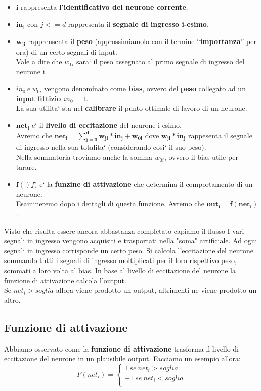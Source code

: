 \begin{itemize}
    \item \( \mathbf{i}\) rappresenta \textbf{l'identificativo del neurone corrente}.
    \item \( \mathbf{in_j} \) con  \(j<=d\) rappresenta il 
%    
    \textbf{segnale di ingresso i-esimo}.
    \item \( \mathbf{w_{ji}} \) rapprensenta il \textbf{peso} 
%
    (approssimiamolo con il termine ``\textbf{importanza}'' per ora) di un 
%
    certo segnali di input.
\\
    Vale a dire che \(w_{1i}\) sara` il peso assegnato al primo segnale di
%   
    ingresso del neurone i. 
    \item \( in_0 \ e\  w_{0i} \) vengono denominato come \textbf{bias}, ovvero 
%
    del \textbf{peso} collegato ad un \textbf{input fittizio \(in_0=1\)}.
\\  
    La sua utilita` sta nel \textbf{calibrare} il punto ottimale di lavoro di un 
%
    neurone.
    \item \( \mathbf{net_i} \) e` il \textbf{livello di eccitazione} del neurone 
%
    i-esimo.
\\
    Avremo che \( \mathbf{net_i = \sum_{j=0}^{d}{w_{ji} * in_j + w_{0i}} } \) dove 
%
    \( \mathbf{w_{ji} * in_j} \) rappesenta il segnale di ingresso nella sua 
%
    totalita` (considerando cosi` il suo peso).
\\ 
    Nella sommatoria troviamo anche la somma \( w_{0i} \), ovvero il bias utile 
%
    per tarare.
    \item \( \mathbf{f()} f) \) e` la \textbf{funzine di attivazione} che determina il 
%
    comportamento di un neurone. 
\\ 
    Esamineremo dopo i dettagli di questa funzione.
%
    Avremo che \( \mathbf{out_i = f(net_i)} \).
\end{itemize}
Visto che risulta essere ancora abbastanza completato capiamo il flusso 
{
    I vari segnali in ingresso vengono acquisiti e trasportati nella "soma" 
    artificiale.
}
{
    Ad ogni segnali in ingresso corrisponde un certo peso.
}
{
    Si calcola l'eccitazione del neurone sommando tutti i segnali di ingresso 
%
    moltiplicati per il loro rispettivo peso, sommati a loro volta al bias.
}
{
    In base al livello di eccitazione del neurone la funzione di attivazione 
% 
    calcola l'output.
\\
    Se \(net_i > soglia\) allora viene prodotto un output, altrimenti ne viene 
%
    prodotto un altro.
}
\subsection{Funzione di attivazione}
Abbiamo osservato come la \textbf{funzione di attivazione} trasforma il livello di 
eccitazione del neurone in un plausibile output.
Facciamo un esempio allora:
\[F(net_i)=\begin{cases}
    1 \ se\ net_i>soglia \\
    -1 \ se\ net_i<soglia \\
\end{cases}\] 

 